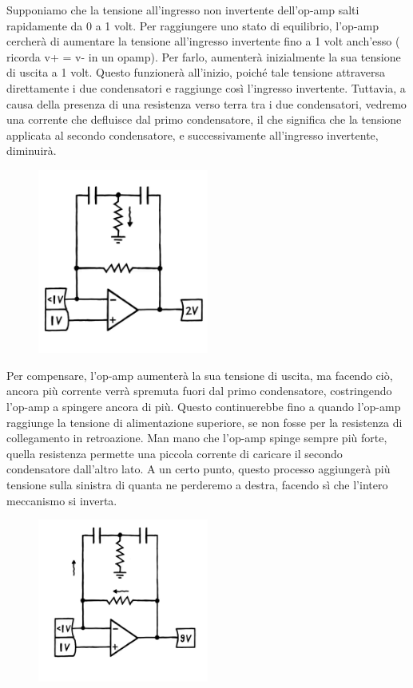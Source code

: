 \documentclass{article}
\begin{document}
 Supponiamo che la tensione all'ingresso non invertente dell'op-amp salti rapidamente da 0 a 1 volt. Per raggiungere uno stato di equilibrio, l'op-amp cercherà di aumentare la tensione all'ingresso invertente fino a 1 volt anch'esso ( ricorda v+ = v- in un opamp). Per farlo, aumenterà inizialmente la sua tensione di uscita a 1 volt. Questo funzionerà all'inizio, poiché tale tensione attraversa direttamente i due condensatori e raggiunge così l'ingresso invertente. Tuttavia, a causa della presenza di una resistenza verso terra tra i due condensatori, vedremo una corrente che defluisce dal primo condensatore, il che significa che la tensione applicata al secondo condensatore, e successivamente all'ingresso invertente, diminuirà.

\begin{figure}[h]
    \centering
    \includegraphics[width=0.5\textwidth]{Toscillator2.png} 
    \label{fig:Toscillator2}
\end{figure}

Per compensare, l'op-amp aumenterà la sua tensione di uscita, ma facendo ciò, ancora più corrente verrà spremuta fuori dal primo condensatore, costringendo l'op-amp a spingere ancora di più. Questo continuerebbe fino a quando l'op-amp raggiunge la tensione di alimentazione superiore, se non fosse per la resistenza di collegamento in retroazione. Man mano che l'op-amp spinge sempre più forte, quella resistenza permette una piccola corrente di caricare il secondo condensatore dall'altro lato. A un certo punto, questo processo aggiungerà più tensione sulla sinistra di quanta ne perderemo a destra, facendo sì che l'intero meccanismo si inverta.

\begin{figure}[h]
    \centering
    \includegraphics[width=0.5\textwidth]{Toscillator3.png} 
    \label{fig:Toscillator3}
\end{figure}
\end{document}
